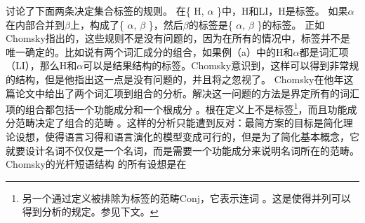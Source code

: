 \citet[]{Chomsky2008a}讨论了下面两条决定集合标签的规则。
\eal
\label{Label-Berechnung}
\ex\label{Label1} 在\{ H, $\alpha$ \}中，H和LI，H是标签。
\ex\label{Label2} 如果$\alpha$在内部合并到$\beta$上，构成了\{ $\alpha$, $\beta$ \}，然后$\beta$的标签是\{ $\alpha$, $\beta$ \}的标签。
\zl
正如Chomsky指出的，这些规则不是没有问题的，因为在所有的情况中，标签并不是唯一确定的。比如说有两个词汇成分的组合，如果例（a）中的H和$\alpha$都是词汇项（LI），那么H和$\alpha$可以是结果结构的标签。Chomsky意识到，这样可以得到非常规的结构，但是他指出这一点是没有问题的，并且将之忽视了。
Chomsky在他\citeyear{Chomsky2013a}年这篇论文中给出了两个词汇项到组合的分析。解决这一问题的方法是界定所有的词汇项的组合都包括一个功能成分和一个根成分 \citep{Marantz97a,Borer2005a-u}。根在定义上不是标签\footnote{%
另一个通过定义被排除为标签的范畴Conj，它表示连词 \citep[--46]{Chomsky2013a}。这是使得并列可以得到分析的规定。参见下文。
}，而且功能成分范畴决定了组合的范畴 \citep[]{Chomsky2013a}。这样的分析只能遭到反对：最简方案的目标是简化理论设想，使得语言习得和语言演化的模型变成可行的，但是为了简化基本概念，它就要设计名词不仅仅是一个名词，而是需要一个功能成分来说明名词所在的范畴。Chomsky的光杆短语结构 \citep{Chomsky95b-u}的所有设想是在\xbarc
